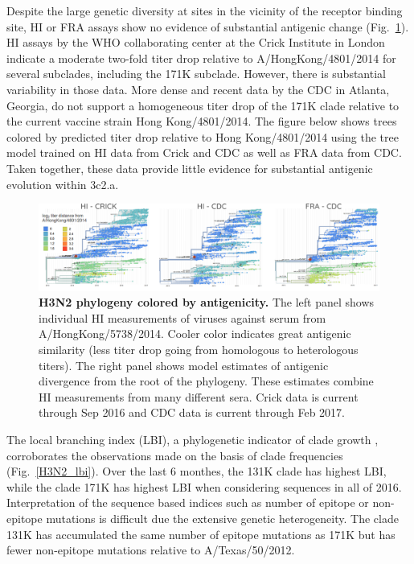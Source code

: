 \documentclass[11pt,oneside,letterpaper]{article}
\begin{document}
Despite the large genetic diversity at sites in the vicinity of the receptor binding site, HI or FRA assays show no evidence of substantial antigenic change (Fig.\ \ref{H3N2_tree_titer_model}).
HI assays by the WHO collaborating center at the Crick Institute in London indicate a moderate two-fold titer drop relative to A/HongKong/4801/2014 for several subclades, including the 171K subclade.
However, there is substantial variability in those data.
More dense and recent data by the CDC in Atlanta, Georgia, do not support a homogeneous titer drop of the 171K clade relative to the current vaccine strain Hong Kong/4801/2014.
The figure below shows trees colored by predicted titer drop relative to Hong Kong/4801/2014 using the tree model \cite{neher2015prediction} trained on HI data from Crick and CDC as well as FRA data from CDC.
Taken together, these data provide little evidence for substantial antigenic evolution within 3c2.a.

\begin{figure}[h!]
	\centering
	\includegraphics[width=1.0\textwidth]{../figures/feb-2017/H3N2_tree_titer_model.png}
	\caption{\textbf{H3N2 phylogeny colored by antigenicity.}
	The left panel shows individual HI measurements of viruses against serum from A/HongKong/5738/2014.
	Cooler color indicates great antigenic similarity (less titer drop going from homologous to heterologous titers).
	The right panel shows model estimates of antigenic divergence from the root of the phylogeny.
	These estimates combine HI measurements from many different sera.
	Crick data is current through Sep 2016 and CDC data is current through Feb 2017.
	}
	\label{H3N2_tree_titer_model}
\end{figure}

The local branching index (LBI), a phylogenetic indicator of clade growth \cite{neher2014predicting}, corroborates the observations made on the basis of clade frequencies (Fig.\ \ref{H3N2_lbi}).
Over the last 6 monthes, the 131K clade has highest LBI, while the clade 171K has highest LBI when considering sequences in all of 2016.
Interpretation of the sequence based indices such as number of epitope or non-epitope mutations \cite{luksza2014predictive} is difficult due the extensive genetic heterogeneity.
The clade 131K has accumulated the same number of epitope mutations as 171K but has fewer non-epitope mutations relative to A/Texas/50/2012.
\end{document}
